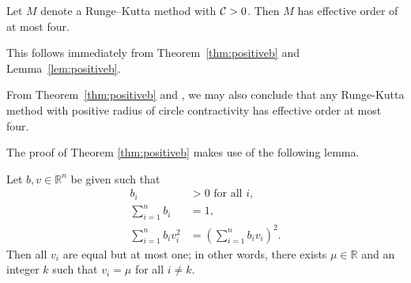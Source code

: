 \begin{corollary}\label{cor:no-ssp-5}
    Let $M$ denote a Runge--Kutta method with $\mathcal{C}>0$.
    Then $M$ has effective order of at most four.
\end{corollary}
This follows immediately from Theorem~\ref{thm:positiveb} and Lemma~\ref{lem:positiveb}.

\begin{remark}
  From Theorem~\ref{thm:positiveb} and \cite[Theorem~4.1]{dahlquist2006}, we
  may also conclude that any Runge-Kutta method with positive radius of circle contractivity
  has effective order at most four.
\end{remark}

The proof of Theorem \ref{thm:positiveb} makes use of the following lemma.
\begin{lemma}\label{Davids_lemma}
	Let $b,v \in \mathbb{R}^{n}$ be given such that
    \begin{subequations}\label{eq:DavidsLemma}
    		\begin{align}
    			b_i & > 0 \mbox{ for all } i, \label{eq:DavidsLemma_a} \\
    			\sum_{i=1}^n b_i & = 1, \label{eq:DavidsLemma_b} \\
    			\sum_{i=1}^n b_i v_i^2 & = \left(\sum_{i=1}^n b_i v_i \right)^2. \label{eq:DavidsLemma_c}
    		\end{align}
    	\end{subequations}
    	Then all $v_i$ are equal but at most one; in other words, there exists $\mu \in \mathbb{R}$ and an integer $k$ such that $v_i = \mu$ for all $i \ne k$.
\end{lemma}

